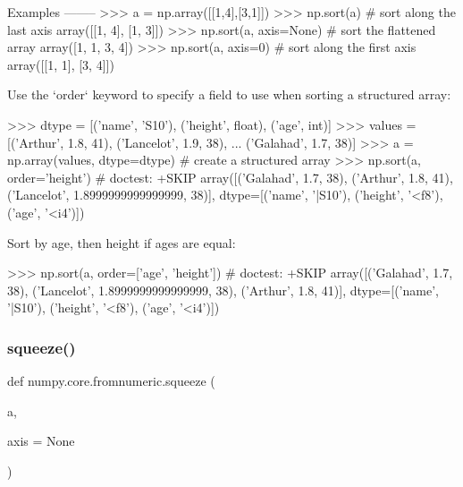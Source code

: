 \begin{DoxyVerb}
Examples
--------
>>> a = np.array([[1,4],[3,1]])
>>> np.sort(a)                # sort along the last axis
array([[1, 4],
       [1, 3]])
>>> np.sort(a, axis=None)     # sort the flattened array
array([1, 1, 3, 4])
>>> np.sort(a, axis=0)        # sort along the first axis
array([[1, 1],
       [3, 4]])

Use the `order` keyword to specify a field to use when sorting a
structured array:

>>> dtype = [('name', 'S10'), ('height', float), ('age', int)]
>>> values = [('Arthur', 1.8, 41), ('Lancelot', 1.9, 38),
...           ('Galahad', 1.7, 38)]
>>> a = np.array(values, dtype=dtype)       # create a structured array
>>> np.sort(a, order='height')                        # doctest: +SKIP
array([('Galahad', 1.7, 38), ('Arthur', 1.8, 41),
       ('Lancelot', 1.8999999999999999, 38)],
      dtype=[('name', '|S10'), ('height', '<f8'), ('age', '<i4')])

Sort by age, then height if ages are equal:

>>> np.sort(a, order=['age', 'height'])               # doctest: +SKIP
array([('Galahad', 1.7, 38), ('Lancelot', 1.8999999999999999, 38),
       ('Arthur', 1.8, 41)],
      dtype=[('name', '|S10'), ('height', '<f8'), ('age', '<i4')])\end{DoxyVerb}
 \mbox{\label{namespacenumpy_1_1core_1_1fromnumeric_aa60aeb04e12e89a7ccba71037d1bc940}} 
\subsubsection{\texorpdfstring{squeeze()}{squeeze()}}
{\footnotesize\ttfamily def numpy.\+core.\+fromnumeric.\+squeeze (\begin{DoxyParamCaption}\item[{}]{a,  }\item[{}]{axis = {\ttfamily None} }\end{DoxyParamCaption})}

